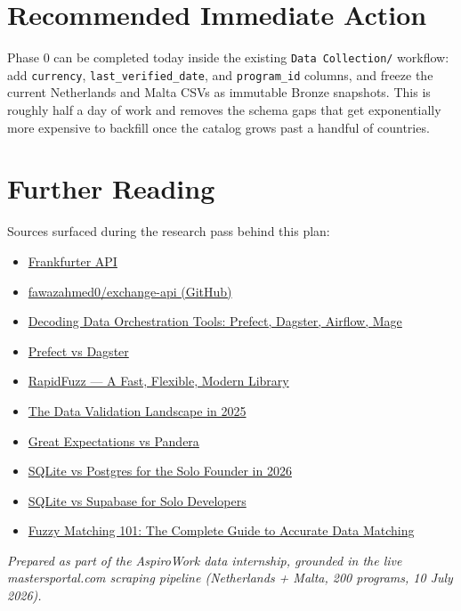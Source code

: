 \documentclass[11pt,a4paper]{article}
\begin{document}
\section{Recommended Immediate Action}

\begin{actionbox}
Phase 0 can be completed today inside the existing \texttt{Data Collection/} workflow: add \texttt{currency}, \texttt{last\_verified\_date}, and \texttt{program\_id} columns, and freeze the current Netherlands and Malta CSVs as immutable Bronze snapshots. This is roughly half a day of work and removes the schema gaps that get exponentially more expensive to backfill once the catalog grows past a handful of countries.
\end{actionbox}

\section{Further Reading}

Sources surfaced during the research pass behind this plan:

\begin{itemize}[leftmargin=1.4em, itemsep=3pt]
  \small
  \item \href{https://frankfurter.dev}{Frankfurter API}
  \item \href{https://github.com/fawazahmed0/exchange-api}{fawazahmed0/exchange-api (GitHub)}
  \item \href{https://engineering.freeagent.com/2025/05/29/decoding-data-orchestration-tools-comparing-prefect-dagster-airflow-and-mage/}{Decoding Data Orchestration Tools: Prefect, Dagster, Airflow, Mage}
  \item \href{https://www.prefect.io/compare/dagster}{Prefect vs Dagster}
  \item \href{https://medium.com/@amarshaw83/rapidfuzz-339295aece71}{RapidFuzz --- A Fast, Flexible, Modern Library}
  \item \href{https://aeturrell.com/blog/posts/the-data-validation-landscape-in-2025/}{The Data Validation Landscape in 2025}
  \item \href{https://medium.com/@bhagyarana80/8-great-expectations-vs-pandera-which-fits-your-python-stack-a115c9241dcb}{Great Expectations vs Pandera}
  \item \href{https://abhishekchaudhary.com/blog/sqlite-vs-postgres-solo-founder}{SQLite vs Postgres for the Solo Founder in 2026}
  \item \href{https://solodevstack.com/blog/sqlite-vs-supabase-solo-developers}{SQLite vs Supabase for Solo Developers}
  \item \href{https://dataladder.com/fuzzy-matching-101/}{Fuzzy Matching 101: The Complete Guide to Accurate Data Matching}
\end{itemize}

\vspace{0.6cm}
{\small\color{graytext}\textit{Prepared as part of the AspiroWork data internship, grounded in the live mastersportal.com scraping pipeline (Netherlands + Malta, 200 programs, 10 July 2026).}}
\end{document}
